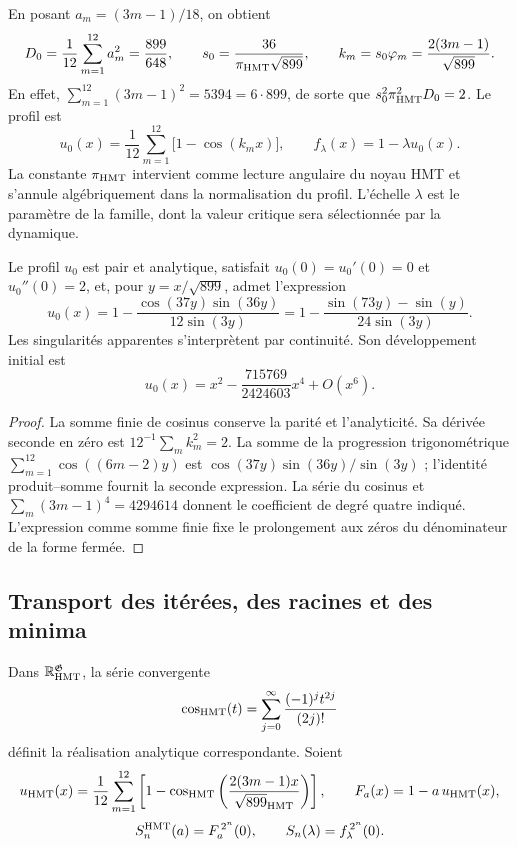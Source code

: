 En posant \(a_m=(3m-1)/18\), on obtient
\[
 D_0=\frac1{12}\sum_{m=1}^{12}a_m^2=\frac{899}{648},
 \qquad
 s_0=\frac{36}{\pi_{\rm HMT}\sqrt{899}},\qquad
 k_m=s_0\varphi_m=\frac{2(3m-1)}{\sqrt{899}}.
\]
En effet, \(\sum_{m=1}^{12}(3m-1)^2=5394=6\cdot899\), de sorte que \(s_0^2\pi_{\rm HMT}^2D_0=2\). Le profil est
\begin{equation}
 u_0(x)=\frac1{12}\sum_{m=1}^{12}\bigl[1-\cos(k_mx)\bigr],
 \qquad f_\lambda(x)=1-\lambda u_0(x).
 \label{hmtfg:perfil-familia}
\end{equation}
La constante \(\pi_{\rm HMT}\) intervient comme lecture angulaire du noyau HMT et s’annule algébriquement dans la normalisation du profil. L’échelle \(\lambda\) est le paramètre de la famille, dont la valeur critique sera sélectionnée par la dynamique.

\begin{proposition}
\label{hmtfg:forma-perfil}
Le profil \(u_0\) est pair et analytique, satisfait
\(u_0(0)=u_0'(0)=0\) et \(u_0''(0)=2\), et, pour
\(y=x/\sqrt{899}\), admet l’expression
\[
 u_0(x)=1-\frac{\cos(37y)\sin(36y)}{12\sin(3y)}
       =1-\frac{\sin(73y)-\sin(y)}{24\sin(3y)}.
\]
Les singularités apparentes s’interprètent par continuité. Son développement initial est
\[
 u_0(x)=x^2-\frac{715769}{2424603}x^4+O(x^6).
\]
\end{proposition}
\begin{proof}
La somme finie de cosinus conserve la parité et l’analyticité. Sa dérivée seconde en zéro est \(12^{-1}\sum_m k_m^2=2\). La somme de la progression trigonométrique \(\sum_{m=1}^{12}\cos((6m-2)y)\) est \(\cos(37y)\sin(36y)/\sin(3y)\) ; l’identité produit--somme fournit la seconde expression. La série du cosinus et \(\sum_m(3m-1)^4=4294614\) donnent le coefficient de degré quatre indiqué. L’expression comme somme finie fixe le prolongement aux zéros du dénominateur de la forme fermée.
\end{proof}

\subsection{Transport des itérées, des racines et des minima}
\label{hmtfg:transporte-raices}

Dans \(\mathbb R_{\rm HMT}^{\mathfrak G}\), la série convergente
\[
 \cos_{\rm HMT}(t)=\sum_{j=0}^{\infty}
                   \frac{(-1)^j t^{2j}}{(2j)!}
\]
définit la réalisation analytique correspondante. Soient
\[
 u_{\rm HMT}(x)=\frac1{12}\sum_{m=1}^{12}
  \left[1-\cos_{\rm HMT}
   \left(\frac{2(3m-1)x}{\sqrt{899}_{\rm HMT}}\right)\right],
 \qquad F_a(x)=1-a\,u_{\rm HMT}(x),
\]
\[
 S_n^{\rm HMT}(a)=F_a^{\,2^n}(0),\qquad
 S_n(\lambda)=f_\lambda^{\,2^n}(0).
\]

